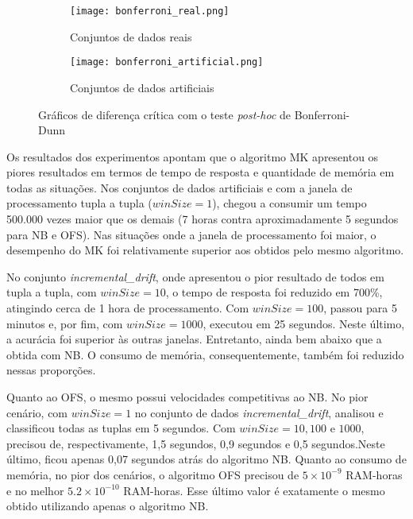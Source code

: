 \begin{figure}[!htb]
\centering
\begin{subfigure}[b]{0.485\textwidth}
\texttt{[image: bonferroni\_real.png]}
\caption{Conjuntos de dados reais} \label{fig:bonferroni_1a}
\end{subfigure}
\hfill %
\begin{subfigure}[b]{0.485\textwidth}
\texttt{[image: bonferroni\_artificial.png]}
\caption{Conjuntos de dados artificiais} \label{fig:bonferroni_1b}
\end{subfigure}
\caption{Gráficos de diferença crítica com o teste \textit{post-hoc} de Bonferroni-Dunn} \label{fig:bonferroni}
\end{figure}



Os resultados dos experimentos apontam  que o algoritmo MK apresentou os piores resultados em termos de tempo de resposta e quantidade de memória em todas as situações. Nos conjuntos de dados artificiais e com a janela de processamento tupla a tupla ($winSize=1$), chegou a consumir um tempo 500.000 vezes maior que os demais (7 horas contra aproximadamente 5 segundos para NB e OFS). Nas situações onde a janela de processamento foi maior,  o desempenho do MK foi relativamente superior aos obtidos pelo mesmo algoritmo. 

No conjunto \textit{incremental\_drift}, onde apresentou o pior resultado de todos em tupla a tupla, com $winSize=10$, o tempo de resposta foi reduzido em 700\%, atingindo cerca de 1 hora de processamento. Com $winSize=100$, passou para 5 minutos e, por fim, com $winSize=1000$, executou em 25 segundos. Neste último, a acurácia foi superior às outras janelas. Entretanto, ainda bem abaixo que a obtida com NB. O consumo de memória, consequentemente, também foi reduzido nessas proporções.

Quanto ao OFS, o mesmo possui velocidades competitivas ao NB. No pior cenário, com $winSize=1$ no conjunto de dados \textit{incremental\_drift}, analisou e classificou todas as tuplas em 5 segundos. Com $winSize=10,100 \text{ e } 1000$, precisou de, respectivamente, 
1,5 segundos, 0,9 segundos e 0,5 segundos.Neste último, ficou apenas 0,07 segundos atrás 
do algoritmo NB. Quanto ao consumo de memória, no pior dos cenários, o algoritmo OFS
precisou de $5\times10^{-9}$ RAM-horas e no melhor $5.2\times10^{-10}$ RAM-horas. Esse último valor é exatamente o mesmo obtido utilizando apenas o algoritmo NB.

